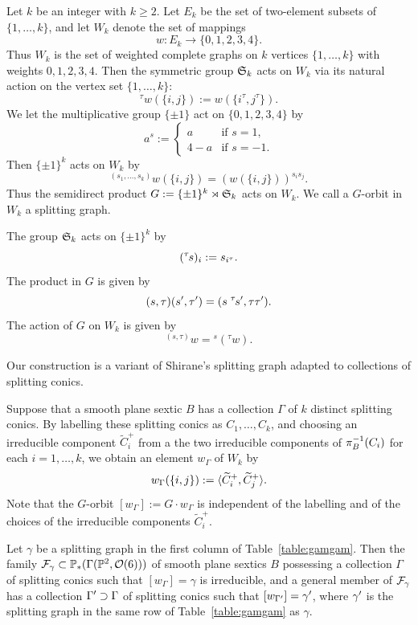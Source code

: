 \documentclass{amsart} %
\newcommand{\ps}{B}
\newcommand{\con}{C}
\newcommand{\wtcon}{\widetilde{\con}}
\newcommand{\pips}{\pi_{\ps}}
\newcommand{\col}{\Gamma }
\newcommand{\gra}{w}
\begin{document}
\par
Let $k$ be an integer with $k\ge 2$.
Let $E_k$ be the set of two-element subsets of $\{1,…,k\}$,
and  let
$W_k$ denote the set of mappings 
\[
w\colon E_k\to \{0,1,2,3,4\}.
\]
Thus $W_k$ is the set of weighted complete graphs on $k$ vertices $\{1, \dots, k\}$  with weights $0,1,2,3,4$.
Then the symmetric group $\mathord{\mathfrak{S}}_k$ acts on $W_k$  via its natural action on the vertex set
$\{1, \dots, k\}$:
\[
{}^\tau w (\{i, j\}):=w(\{i^\tau, j^\tau\}).
\]
We let the multiplicative group $\{\pm 1\}$ act on $ \{0,1,2,3,4\}$ by 
\[
a^s :=
\begin{cases}
a     & \text{if } s=1,\\
4-a   & \text{if } s=-1.
\end{cases}
\]
Then $\{\pm 1\}^k$ acts on $W_k$ by 
\[
{}^{(s_1, \dots, s_k)} w(\{i, j\})=(w(\{i, j\}))^{s_i s_j}.
\]
Thus the semidirect product  $G:=\{\pm 1\}^k\rtimes \mathord{\mathfrak{S}}_k$ acts on $W_k$.
We call a $G$-orbit in $W_k$ a splitting graph.
%
\begin{remark}
The group $\mathord{\mathfrak{S}}_k$ acts on $\{\pm 1\}^k$ by 
 \[
 ({}^\tau\hskip -1pt s)_i:=s_{i^\tau}.
\]
The product in  $G$ is given by
\[
(s, \tau)(s^{\prime}, \tau^{\prime})=(s \;{}^\tau \hskip -1pts^{\prime}, \tau\tau^{\prime}).
\]
The action of $G$ on $W_k$ is given by 
\[
{}^{(s, \tau)} w={}^s ({}^\tau w).
\]
\end{remark}
%
\begin{remark}
Our construction is a  variant of Shirane's
splitting graph adapted to collections of splitting conics.
\end{remark}
%
Suppose that a smooth plane sextic $\ps$ has 
a collection $\col$ of $k$ distinct  splitting conics.
By  labelling  these splitting conics
as $\con_1, \dots, \con_k$,
and choosing an irreducible component 
$\wtcon_i^+$ from a the two irreducible components of 
 $\pips\inv (\con_i)$ for each $i=1, \dots, k$,
we obtain an element $\gra_{\col}$  of $W_k$  by 
\[
\gra_{\col}(\{i, j\}):=\intf{\wtcon_i^+, \wtcon_j^+}.
\]
Note that the $G$-orbit
$[\gra_{\col}]:=G\cdot \gra_{\col}$ 
is independent of the labelling and of the choices of the irreducible components
 $\wtcon_i^+$.
%
\begin{theorem}
Let $\gamma$ be a splitting graph in the first column of Table~\ref{table:gamgam}.
Then the family $\mathord{\mathcal{F}}_{\gamma}\subset \mathord{\mathbb{P}}_*(\Gamma(\mathord{\mathbb{P}}^2, \mathord{\mathcal{O}}(6)))$ of smooth plane sextics $\ps$ possessing a collection $\col$ 
of splitting conics such that $[\gra_{\col}]=\gamma$
is irreducible,
and a general member of $\mathord{\mathcal{F}}_{\gamma}$ 
has a collection $\col\sprime\supset \col$ 
of splitting conics such that $[\gra_{\col\sprime}]=\gamma\sprime$,
where $\gamma^{\prime}$ is the splitting graph 
in the same row of Table~\ref{table:gamgam} as $\gamma$.
\end{theorem}
\end{document}
